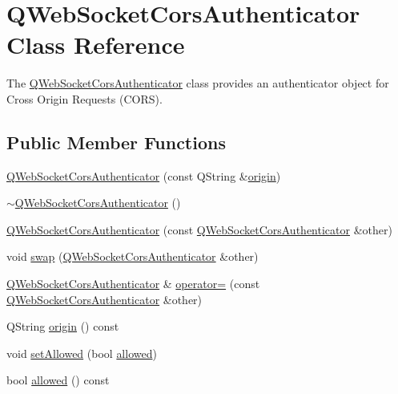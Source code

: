 \hypertarget{class_q_web_socket_cors_authenticator}{}\section{Q\+Web\+Socket\+Cors\+Authenticator Class Reference}
\label{class_q_web_socket_cors_authenticator}


The \mbox{\hyperlink{class_q_web_socket_cors_authenticator}{Q\+Web\+Socket\+Cors\+Authenticator}} class provides an authenticator object for Cross Origin Requests (C\+O\+RS).  


\subsection*{Public Member Functions}
\begin{DoxyCompactItemize}
\item 
\mbox{\hyperlink{class_q_web_socket_cors_authenticator_a4488fbb448e5cdcbbebc97b57c4e6b7c}{Q\+Web\+Socket\+Cors\+Authenticator}} (const Q\+String \&\mbox{\hyperlink{class_q_web_socket_cors_authenticator_a5203b2383c444d4b4facc7f1fba283b0}{origin}})
\item 
\mbox{\hyperlink{class_q_web_socket_cors_authenticator_a9faaeee4cc6f23f30c49c300095f6095}{$\sim$\+Q\+Web\+Socket\+Cors\+Authenticator}} ()
\item 
\mbox{\hyperlink{class_q_web_socket_cors_authenticator_a3955589b5ff50150df93eae9b21c012b}{Q\+Web\+Socket\+Cors\+Authenticator}} (const \mbox{\hyperlink{class_q_web_socket_cors_authenticator}{Q\+Web\+Socket\+Cors\+Authenticator}} \&other)
\item 
void \mbox{\hyperlink{class_q_web_socket_cors_authenticator_ad7736d3520ddb2a720bb23dc3333dfac}{swap}} (\mbox{\hyperlink{class_q_web_socket_cors_authenticator}{Q\+Web\+Socket\+Cors\+Authenticator}} \&other)
\item 
\mbox{\hyperlink{class_q_web_socket_cors_authenticator}{Q\+Web\+Socket\+Cors\+Authenticator}} \& \mbox{\hyperlink{class_q_web_socket_cors_authenticator_a4e4e60c27f0abd48d6e1662c279c8c80}{operator=}} (const \mbox{\hyperlink{class_q_web_socket_cors_authenticator}{Q\+Web\+Socket\+Cors\+Authenticator}} \&other)
\item 
Q\+String \mbox{\hyperlink{class_q_web_socket_cors_authenticator_a5203b2383c444d4b4facc7f1fba283b0}{origin}} () const
\item 
void \mbox{\hyperlink{class_q_web_socket_cors_authenticator_a1b74ba4993ef3092dc9a5de402467413}{set\+Allowed}} (bool \mbox{\hyperlink{class_q_web_socket_cors_authenticator_a2ffc01ec9c913f4d78aa34d44f1c69fb}{allowed}})
\item 
bool \mbox{\hyperlink{class_q_web_socket_cors_authenticator_a2ffc01ec9c913f4d78aa34d44f1c69fb}{allowed}} () const
\end{DoxyCompactItemize}


